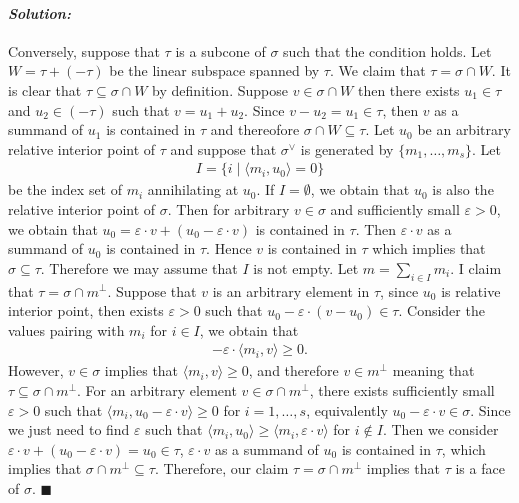 \documentclass[12pt, a4paper]{article}
\newenvironment{solution}
  {\paragraph{\textit{Solution:}}\par\medskip}
  {\hfill$\blacksquare$\vspace{0.1cm}}
\begin{document}
\begin{solution}
Conversely, suppose that $\tau$ is a subcone of $\sigma$ such that the condition holds. 
Let $W=\tau+(-\tau)$ be the linear subspace spanned by $\tau$. We claim that $\tau=\sigma\cap W$. It is clear that $\tau\subseteq \sigma\cap W$ by definition.
Suppose $v\in \sigma\cap W$ then there exists $u_1\in \tau$ and $u_2\in (-\tau)$ such that $v= u_1+u_2$. Since $v-u_2 = u_1\in \tau$, then $v$ as a summand of $u_1$ is contained in $\tau$ and thereofore $\sigma\cap W\subseteq \tau$.
Let $u_0$ be an arbitrary relative interior point of $\tau$ and suppose that $\sigma^\vee$ is generated by $\{m_1,\dots,m_s\}$.
Let 
\begin{align*}
    I = \{ i \mid \langle m_i, u_0 \rangle = 0 \}
\end{align*}
be the index set of $m_i$ annihilating at $u_0$. If $I=\emptyset$, we obtain that $u_0$ is also the relative interior point of $\sigma$. Then for arbitrary $v\in \sigma$ and sufficiently small $\varepsilon>0$, we obtain 
that $u_0 = \varepsilon\cdot v+(u_0-\varepsilon\cdot v)$ is contained in $\tau$. Then $\varepsilon\cdot v$ as a summand of $u_0$ is contained in $\tau$. Hence $v$ is contained in $\tau$ which implies that $\sigma\subseteq \tau$.
Therefore we may assume that $I$ is not empty. Let $m=\sum_{i\in I}m_i$. I claim that $\tau=\sigma\cap m^\perp$.
Suppose that $v$ is an arbitrary element in $\tau$, since $u_0$ is relative interior point, then exists $\varepsilon>0$ such that $u_0-\varepsilon\cdot (v-u_0)\in\tau$. 
Consider the values pairing with $m_i$ for $i\in I$, we obtain that 
\begin{align*}
    -\varepsilon \cdot \langle m_i,v \rangle \ge 0.
\end{align*}
However, $v\in \sigma$ implies that $\langle m_i,v\rangle\ge 0$, and therefore $v\in m^\perp$ meaning that $\tau\subseteq \sigma\cap m^\perp$.
For an arbitrary element $v\in\sigma\cap m^\perp$, there exists sufficiently small $\varepsilon>0$ such that $\langle m_i,u_0-\varepsilon\cdot v\rangle\ge 0$ for $i=1,\dots,s$, equivalently $u_0-\varepsilon\cdot v\in \sigma$.
Since we just need to find $\varepsilon$ such that $\langle m_i,u_0\rangle\ge \langle m_i,\varepsilon\cdot v\rangle$ for $i\notin I$.
Then we consider $\varepsilon\cdot v+(u_0-\varepsilon\cdot v)= u_0\in \tau$, $\varepsilon\cdot v$ as a summand of $u_0$ is contained in $\tau$, which implies that $\sigma\cap m^\perp \subseteq \tau$.
Therefore, our claim $\tau=\sigma\cap m^{\perp}$ implies that $\tau$ is a face of $\sigma$.
\end{solution}
\end{document}
